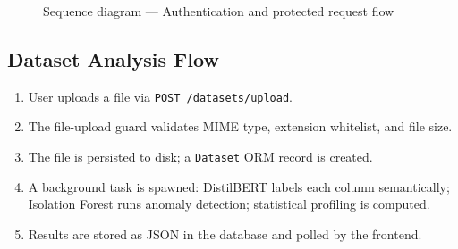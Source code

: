 \documentclass[12pt,a4paper]{report}
\begin{document}
\begin{figure}[H]
\caption{Sequence diagram --- Authentication and protected request flow}
\label{fig:seq_auth}
\end{figure}

\subsection{Dataset Analysis Flow}

\begin{enumerate}[leftmargin=2em]
    \item User uploads a file via \texttt{POST /datasets/upload}.
    \item The file-upload guard validates MIME type, extension whitelist, and file size.
    \item The file is persisted to disk; a \texttt{Dataset} ORM record is created.
    \item A background task is spawned: DistilBERT labels each column semantically; Isolation Forest runs anomaly detection; statistical profiling is computed.
    \item Results are stored as JSON in the database and polled by the frontend.
\end{enumerate}
\end{document}
